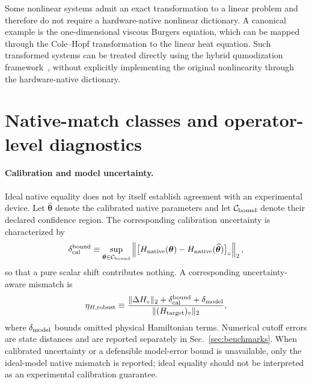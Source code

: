 \documentclass[pra,twocolumn,superscriptaddress,nofootinbib,floatfix]{revtex4-2}
\theoremstyle{remark}
\newcommand{\revcolor}{\color{blue}}
\DeclareRobustCommand{\rev}[1]{{\revcolor #1}}
\begin{document}
Some nonlinear systems admit an exact transformation to a linear problem and therefore do not require a hardware-native nonlinear dictionary. A canonical example is the one-dimensional viscous Burgers equation, which can be mapped through the Cole--Hopf transformation to the linear heat equation. Such transformed systems can be treated directly using the hybrid qumodization framework~\cite{das2026quantumdifferentialequationsolver}, without explicitly implementing the original nonlinearity through the hardware-native dictionary.

\section{\rev{Native-match classes and operator-level diagnostics}}
\label{app:native-match}
\label{app:class-diagnostics}

\paragraph{Calibration and model uncertainty.}
Ideal native equality does not by itself establish agreement with an experimental device. Let \(\widehat{\boldsymbol\theta}\) denote the calibrated native parameters and let \(\mathcal C_{\rm bound}\) denote their declared confidence region. The corresponding calibration uncertainty is characterized by
\begingroup\revcolor
\begin{align}
\delta_{\rm cal}^{\rm bound}\equiv\sup_{\boldsymbol\theta\in\mathcal C_{\rm bound}}\left\|\bigl[H_{\rm native}(\boldsymbol\theta)-H_{\rm native}(\widehat{\boldsymbol\theta})\bigr]_\circ\right\|_2 ,
\end{align}
\endgroup
\rev{so that a pure scalar shift contributes nothing.} A corresponding uncertainty-aware mismatch is
\begingroup\revcolor
\begin{align}
\eta_{H,{\rm robust}}\equiv\frac{\|\Delta H_\circ\|_2+\delta_{\rm cal}^{\rm bound}+\delta_{\rm model}}{\|(H_{\rm target})_\circ\|_2},
\label{eq:robust-native-mismatch}
\end{align}
\endgroup
where \(\delta_{\rm model}\) bounds omitted physical Hamiltonian terms. \rev{Numerical cutoff errors are state distances and are reported separately in Sec.~\ref{sec:benchmarks}.} When calibrated uncertainty or a defensible model-error bound is unavailable, only the ideal-model native mismatch is reported; ideal equality should not be interpreted as an experimental calibration guarantee.
\end{document}
